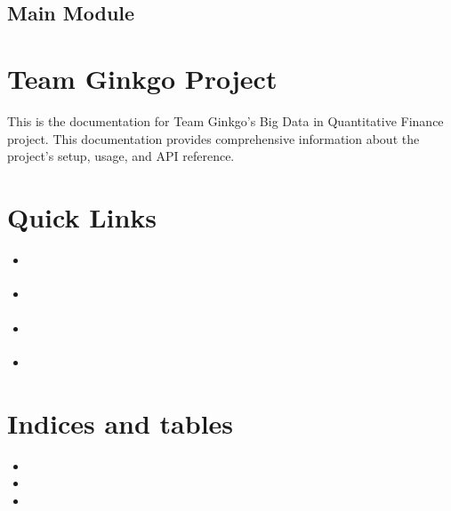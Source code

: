 \documentclass[letterpaper,10pt,english]{sphinxmanual}
\begin{document}
\section{Main Module}
\label{\detokenize{api_reference:main-module}}

\chapter{Team Ginkgo Project}
\label{\detokenize{index:team-ginkgo-project}}
\sphinxAtStartPar
This is the documentation for Team Ginkgo’s Big Data in Quantitative Finance project. This documentation provides comprehensive information about the project’s setup, usage, and API reference.


\chapter{Quick Links}
\label{\detokenize{index:quick-links}}\begin{itemize}
\item {} 
\sphinxAtStartPar
{\hyperref[\detokenize{installation:installation}]{}}

\item {} 
\sphinxAtStartPar
{\hyperref[\detokenize{usage:usage}]{}}

\item {} 
\sphinxAtStartPar
{\hyperref[\detokenize{architecture:architecture}]{}}

\item {} 
\sphinxAtStartPar
{\hyperref[\detokenize{api_reference:api-reference}]{}}

\end{itemize}


\chapter{Indices and tables}
\label{\detokenize{index:indices-and-tables}}\begin{itemize}
\item {} 
\sphinxAtStartPar
{}

\item {} 
\sphinxAtStartPar
{}

\item {} 
\sphinxAtStartPar
{}

\end{itemize}


\renewcommand{\indexname}{Python Module Index}
\begin{sphinxtheindex}
\let\bigletter\sphinxstyleindexlettergroup
\bigletter{c}
\item\relax{}
\end{sphinxtheindex}

\renewcommand{\indexname}{Index}
\printindex
\end{document}
